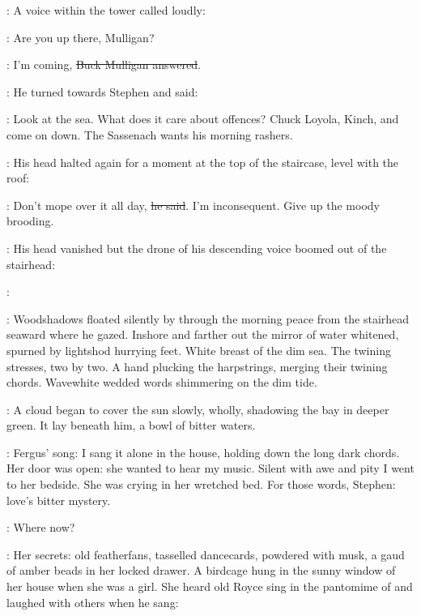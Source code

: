 :
A voice within the tower called loudly:

\Haines:
Are you up there, Mulligan?

\Mulligan:
I'm coming,
\sout{Buck Mulligan answered}.

:
He turned towards Stephen and said:

\Mulligan:
Look at the sea.
What does it care about offences?
Chuck Loyola, Kinch,
and come on down.
The Sassenach wants his morning rashers.

:
His head halted again for a moment at the top of the staircase,
level with the roof:

\Mulligan:
Don't mope over it all day,
\sout{he said}.
I'm inconsequent.
Give up the moody brooding.

:
His head vanished
but the drone of his descending voice boomed out of the stairhead:

\Mulligan:
\begin{verse}
\end{verse}

:
Woodshadows floated silently by
through the morning peace
from the stairhead seaward where he gazed.
Inshore and farther out
the mirror of water whitened,
spurned by lightshod hurrying feet.
White breast of the dim sea.
The twining stresses, two by two.
A hand plucking the harpstrings,
merging their twining chords.
Wavewhite wedded words
shimmering on the dim tide.

:
A cloud began to cover the sun
slowly, wholly,
shadowing the bay in deeper green.
It lay beneath him, a bowl of bitter waters.

\StephenInt:
Fergus' song:
I sang it alone in the house,
holding down the long dark chords.
Her door was open:
she wanted to hear my music.
Silent with awe and pity
I went to her bedside.
She was crying in her wretched bed.
For those words,
Stephen:
love's bitter mystery.

\StephenInt:
Where now?

\StephenInt:
Her secrets:
old featherfans,
tasselled dancecards,
powdered with musk,
a gaud of amber beads in her locked drawer.
A birdcage hung in the sunny
window of her house when she was a girl.
She heard old Royce sing in the pantomime of 
and laughed with others when he sang:

